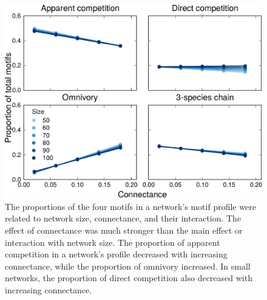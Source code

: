 \documentclass[12pt]{article}
\begin{document}
\begin{spacing}{2.0}
    \begin{figure}[hb!]
        \centering
        \includegraphics[width=\textwidth]{manuscript/figures/motif_proportion_lms.pdf}
        \caption{The proportions of the four motifs in a network's motif profile were related to network size, connectance, and their interaction. The effect of connectance was much stronger than the main effect or interaction with network size. The proportion of apparent competition in a network's profile decreased with increasing connectance, while the proportion of omnivory increased. In small networks, the proportion of direct competition also decreased with increasing connectance.}
        \label{motif_proportion_lms}
    \end{figure}

\clearpage


\end{spacing}
\end{document}
